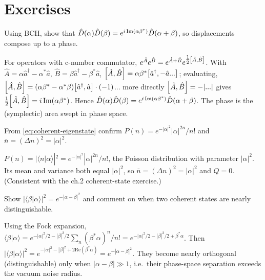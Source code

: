\section*{Exercises}

\begin{exercise}
Using BCH, show that $\hat{D}(\alpha)\hat{D}(\beta)=e^{i\,\mathrm{Im}(\alpha\beta^*)}\hat{D}(\alpha+\beta)$,
so displacements compose up to a phase.
\begin{solution}
For operators with c-number commutator,
$e^{\hat A}e^{\hat B}=e^{\hat A+\hat B}e^{\tfrac12\comm{\hat A}{\hat B}}$.
With $\hat A=\alpha\hat a^\dagger-\alpha^*\hat a$,
$\hat B=\beta\hat a^\dagger-\beta^*\hat a$,
$\comm{\hat A}{\hat B}=\alpha\beta^*\comm{\hat a^\dagger}{-\hat a... }$;
evaluating, $\comm{\hat A}{\hat B}=(\alpha\beta^*-\alpha^*\beta)\comm{\hat a^\dagger}{\hat a}\cdot(-1)$...
more directly $\comm{\hat A}{\hat B}=-|...|$ gives
$\tfrac12\comm{\hat A}{\hat B}=i\,\mathrm{Im}(\alpha\beta^*)$. Hence
$\hat{D}(\alpha)\hat{D}(\beta)=e^{i\,\mathrm{Im}(\alpha\beta^*)}\hat{D}(\alpha+\beta)$.
The phase is the (symplectic) area swept in phase space.
\end{solution}
\end{exercise}

\begin{exercise}
From \cref{eq:coherent-eigenstate} confirm
$P(n)=e^{-|\alpha|^2}|\alpha|^{2n}/n!$ and $\bar n=(\Delta n)^2=|\alpha|^2$.
\begin{solution}
$P(n)=|\langle n|\alpha\rangle|^2=e^{-|\alpha|^2}|\alpha|^{2n}/n!$, the
Poisson distribution with parameter $|\alpha|^2$. Its mean and
variance both equal $|\alpha|^2$, so $\bar n=(\Delta n)^2=|\alpha|^2$
and $Q=0$. (Consistent with the ch.2 coherent-state exercise.)
\end{solution}
\end{exercise}

\begin{exercise}
Show $|\langle\beta|\alpha\rangle|^2=e^{-|\alpha-\beta|^2}$ and
comment on when two coherent states are nearly distinguishable.
\begin{solution}
Using the Fock expansion,
$\langle\beta|\alpha\rangle=e^{-|\alpha|^2/2-|\beta|^2/2}\sum_n(\beta^*\alpha)^n/n!=e^{-|\alpha|^2/2-|\beta|^2/2+\beta^*\alpha}$.
Then $|\langle\beta|\alpha\rangle|^2=e^{-|\alpha|^2-|\beta|^2+2\mathrm{Re}(\beta^*\alpha)}=e^{-|\alpha-\beta|^2}$.
They become nearly orthogonal (distinguishable) only when
$|\alpha-\beta|\gg1$, i.e.\ their phase-space separation exceeds the
vacuum noise radius.
\end{solution}
\end{exercise}

